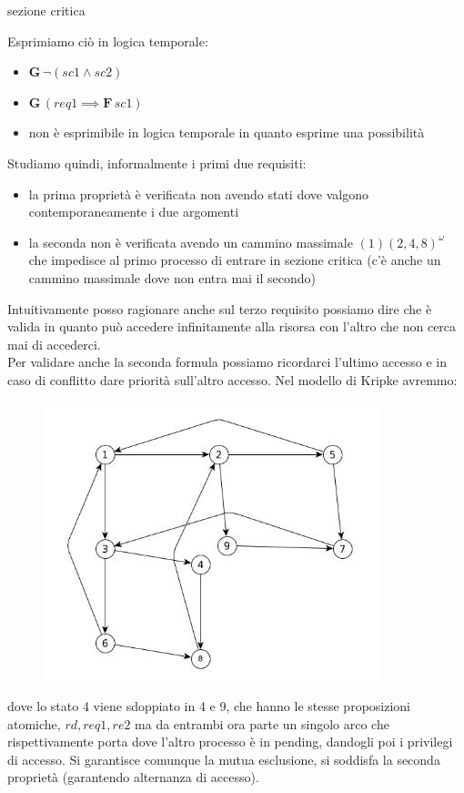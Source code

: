 \documentclass[a4paper,12pt, oneside]{book}
\begin{document}
\begin{esempio}
\begin{itemize}
    sezione critica
  \end{itemize}
  Esprimiamo ciò in logica temporale:
  \begin{itemize}
    \item $\mathbf{G}\,\neg(sc1\land sc2)$
    \item $\mathbf{G}\,(req1\implies \mathbf{F}\,sc1)$
    \item non è esprimibile in logica temporale in quanto esprime una
    possibilità 
  \end{itemize}
  Studiamo quindi, informalmente i primi due requisiti:
  \begin{itemize}
    \item la prima proprietà è verificata non avendo stati dove valgono
    contemporaneamente i due argomenti
    \item la seconda non è verificata avendo un cammino massimale
    $(1)(2,4,8)^\omega$ che impedisce al primo processo di entrare in sezione
    critica (c'è anche un cammino massimale dove non entra mai il secondo)
  \end{itemize}
  Intuitivamente posso ragionare anche sul terzo requisito possiamo dire che è
  valida in quanto può accedere infinitamente alla risorsa con l'altro che non
  cerca mai di accederci.\\
  Per validare anche la seconda formula possiamo ricordarci l'ultimo accesso e
  in caso di conflitto dare priorità sull'altro accesso. Nel modello di Kripke
  avremmo: 
  \begin{figure}[H]
    \centering
    \includegraphics[scale = 0.6]{img/mc3.jpg}
  \end{figure}
  dove lo stato 4 viene sdoppiato in 4 e 9, che hanno le stesse proposizioni
  atomiche, $rd,req1,re2$ ma da entrambi ora parte un singolo arco che
  rispettivamente porta dove l'altro processo è in pending, dandogli poi i
  privilegi di accesso. Si garantisce comunque la mutua esclusione, si soddisfa
  la seconda proprietà (garantendo alternanza di accesso).
\end{esempio}
\end{document}

